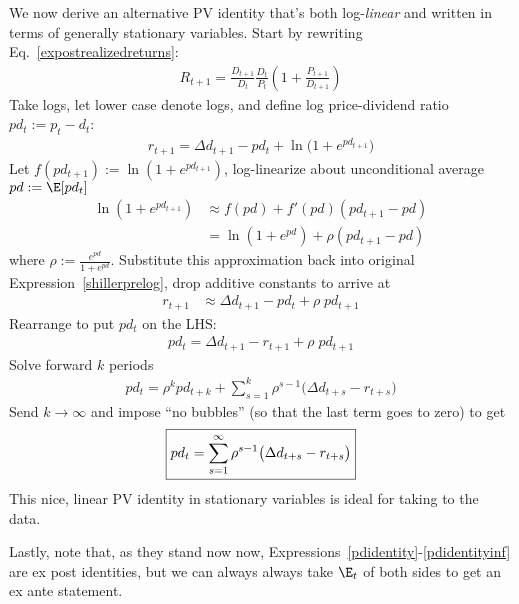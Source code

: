 \documentclass[12pt]{article}
\theoremstyle{plain}
\theoremstyle{definition}
\theoremstyle{remark}
\newcommand{\ra}{\rightarrow}
\begin{document}
\begin{multicols*}{2}
We now derive an alternative PV identity that's both log-\emph{linear}
and written in terms of generally stationary variables.
Start by rewriting Eq.~\ref{expostrealizedreturns}:
\begin{align*}
  R_{t+1}
  =
  \frac{D_{t+1}}{D_t}
  \frac{D_{t}}{P_t}
  \left(
  1+
  \frac{P_{t+1}}{D_{t+1}}
  \right)
\end{align*}
Take logs, let lower case denote logs, and define log price-dividend
ratio $pd_t:=p_t-d_t$:
\begin{align}
  r_{t+1}
  =
  \Delta d_{t+1} - pd_t + \ln\big( 1+ e^{pd_{t+1}} \big)
  \label{shillerprelog}
\end{align}
Let $f(pd_{t+1}):=\ln(1+e^{pd_{t+1}})$, log-linearize
about unconditional average $pd:=\E[pd_t]$
\begin{align*}
  \ln(1+e^{pd_{t+1}})
  &\approx
  f(pd) + f'(pd)(pd_{t+1}-pd)
  \\
  &=
  \ln(1+e^{pd})
  +
  \rho
  (pd_{t+1}-pd)
\end{align*}
where $\rho:=\frac{e^{pd}}{1+e^{pd}}$.
Substitute this approximation back into original
Expression~\ref{shillerprelog}, drop additive constants to arrive at
\begin{align*}
  r_{t+1}
  &\approx \Delta d_{t+1} - pd_t + \rho \; pd_{t+1}
\end{align*}
Rearrange to put $pd_t$ on the LHS:
\begin{align}
  pd_t
  =
    \Delta d_{t+1}- r_{t+1} + \rho \; pd_{t+1}
  \label{pdidentity}
\end{align}
Solve forward $k$ periods
\begin{align}
  pd_t = \rho^kpd_{t+k}
  +\sum_{s=1}^k \rho^{s-1}\big(\Delta d_{t+s}-r_{t+s}\big)
  \label{pdidentityk}
\end{align}
Send $k\ra \infty$ and impose ``no bubbles'' (so that the last term goes
to zero) to get
\begin{align}
  \boxed{%
  pd_t
  =
  \sum_{s=1}^\infty
  \rho^{s-1}\big(\Delta d_{t+s}-r_{t+s}\big)
  }
  \label{pdidentityinf}
\end{align}
This nice, linear PV identity in stationary variables is ideal for
taking to the data.

Lastly, note that, as they stand now now,
Expressions~\ref{pdidentity}-\ref{pdidentityinf} are ex post identities,
but we can always always take $\E_t$ of both sides to get an ex ante
statement.


\end{multicols*}
\end{document}
